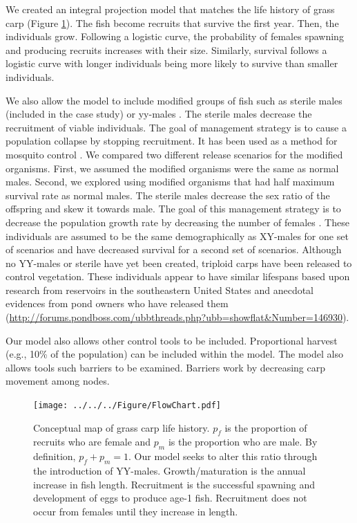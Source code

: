 \documentclass{article}[12pt]
\begin{document}
We created an integral projection model that matches the life history of grass carp (Figure \ref{fig:cMap}).
The fish become recruits that survive the first year.
Then, the individuals grow. 
Following a logistic curve, the probability of females spawning and producing recruits increases with their size. 
Similarly, survival follows a logistic curve with longer individuals being more likely to survive than smaller individuals.

We also allow the model to include modified groups of fish such as sterile males (included in the case study) or yy-males \citep[previously described in][]{Erickson:2017ecomod}.
The sterile males decrease the recruitment of viable individuals.
The goal of management strategy is to cause a population collapse by stopping recruitment. 
It has been used as a method for mosquito control \citep[e.g.,][]{benedict2003first}.
We compared two different release scenarios for the modified organisms.
First, we assumed the modified organisms were the same as normal males.
Second, we explored using modified organisms that had half maximum survival rate as normal males.
The sterile males decrease the sex ratio of the offspring and skew it towards male.
The goal of this management strategy is to decrease the population growth rate by decreasing the number of females \citep{schill2016production}. 
These individuals are assumed to be the same demographically as XY-males for one set of scenarios and have decreased survival for a second set of scenarios. 
Although no YY-males or sterile have yet been created, triploid carps have been released to control vegetation.
These individuals appear to have similar lifespans based upon research from reservoirs in the southeastern United States \citep{kirk2003longevity} and anecdotal evidences from pond owners who have released them (\url{http://forums.pondboss.com/ubbthreads.php?ubb=showflat&Number=146930}).

Our model also allows other control tools to be included.
Proportional harvest (e.g., 10\% of the population) can be included within the model.
The model also allows tools such barriers to be examined.
Barriers work by decreasing carp movement among nodes.


\begin{figure}[htbp]
	\centering
	\texttt{[image: ../../../Figure/FlowChart.pdf]} 
	   \caption{Conceptual map of grass carp life history. \(p_f\) is the proportion of recruits who are female and \(p_m\) is the proportion who are male. By definition, \(p_f + p_m = 1\).  Our model seeks to alter this ratio through the introduction of YY-males. Growth/maturation is the annual increase in fish length. Recruitment is the successful spawning and development of eggs to produce age-1 fish. Recruitment does not occur from females until they increase in length.}
   \label{fig:cMap}
\end{figure}
\end{document}
